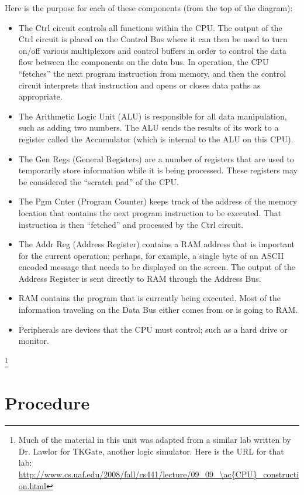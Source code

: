 Here is the purpose for each of these components (from the top of the diagram):

\begin{itemize}
	\item The Ctrl circuit controls all functions within the \ac{CPU}. The output of the Ctrl circuit is placed on the Control Bus where it can then be used to turn on/off various multiplexors and control buffers in order to control the data flow between the components on the data bus. In operation, the \ac{CPU} “fetches” the next program instruction from memory, and then the control circuit interprets that instruction and opens or closes data paths as appropriate.
	\item The Arithmetic Logic Unit (ALU) is responsible for all data manipulation, such as adding two numbers. The ALU sends the results of its work to a register called the Accumulator (which is internal to the ALU on this \ac{CPU}). 
	\item The Gen Regs (General Registers) are a number of registers that are used to temporarily store information while it is being processed. These registers may be considered the “scratch pad” of the \ac{CPU}.
	\item The Pgm Cnter (Program Counter) keeps track of the address of the memory location that contains the next program instruction to be executed. That instruction is then “fetched” and processed by the Ctrl circuit.
	\item The Addr Reg (Address Register) contains a RAM address that is important for the current operation; perhaps, for example, a single byte of an ASCII encoded message that needs to be displayed on the screen. The output of the Address Register is sent directly to RAM through the Address Bus. 
	\item RAM contains the program that is currently being executed. Most of the information traveling on the Data Bus either comes from or is going to RAM.
	\item Peripherals are devices that the \ac{CPU} must control; such as a hard drive or monitor.
\end{itemize}

\footnote{Much of the material in this unit was adapted from a similar lab written by Dr. Lawlor for TKGate, another logic simulator. Here is the URL for that lab: \url{http://www.cs.uaf.edu/2008/fall/cs441/lecture/09_09_\ac{CPU}_construction.html}}

\section{Procedure}










